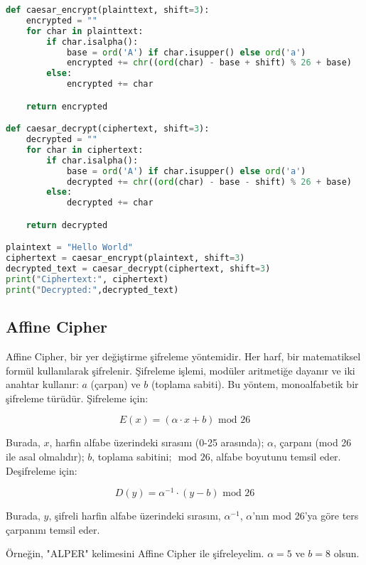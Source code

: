 \begin{lstlisting}[language=Python]
def caesar_encrypt(plainttext, shift=3):
    encrypted = ""
    for char in plainttext:
        if char.isalpha():
            base = ord('A') if char.isupper() else ord('a')
            encrypted += chr((ord(char) - base + shift) % 26 + base)
        else:
            encrypted += char

    return encrypted

def caesar_decrypt(ciphertext, shift=3):
    decrypted = ""
    for char in ciphertext:
        if char.isalpha():
            base = ord('A') if char.isupper() else ord('a')
            decrypted += chr((ord(char) - base - shift) % 26 + base)
        else:
            decrypted += char

    return decrypted

plaintext = "Hello World"
ciphertext = caesar_encrypt(plaintext, shift=3)
decrypted_text = caesar_decrypt(ciphertext, shift=3)
print("Ciphertext:", ciphertext)
print("Decrypted:",decrypted_text)
\end{lstlisting}

\newpage

\subsection{Affine Cipher}

Affine Cipher, bir yer değiştirme şifreleme yöntemidir. Her harf, bir matematiksel formül kullanılarak şifrelenir. Şifreleme işlemi, modüler aritmetiğe dayanır ve iki anahtar kullanır: $a$ (çarpan) ve $b$ (toplama sabiti). Bu yöntem, monoalfabetik bir şifreleme türüdür. Şifreleme için:

\[ E(x) = (\alpha \cdot x + b) \text{ mod } 26 \]

Burada, $x$, harfin alfabe üzerindeki sırasını (0-25 arasında); $\alpha$, çarpanı (mod 26 ile asal olmalıdır); $b$, toplama sabitini; $\text{ mod } 26$, alfabe boyutunu temsil eder. Deşifreleme için:

\[ D(y) = \alpha^{-1} \cdot (y - b) \text{ mod } 26 \]

Burada, $y$, şifreli harfin alfabe üzerindeki sırasını, $\alpha^{-1}$, $\alpha$'nın mod 26'ya göre ters çarpanını temsil eder.

Örneğin, "ALPER" kelimesini Affine Cipher ile şifreleyelim. $\alpha = 5$ ve $b = 8$ olsun.

\begin{table}[ht]
\centering
{}
\end{table}

